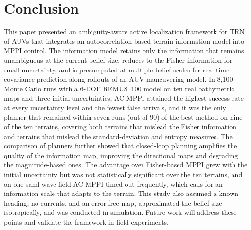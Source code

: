 \documentclass[letterpaper, 10 pt, journal, twoside]{IEEEtran}
\begin{document}
\section{Conclusion}
\label{sec:conclusion}
This paper presented an ambiguity-aware active localization framework for TRN of AUVs that integrates an autocorrelation-based terrain information model into MPPI control. The information model retains only the information that remains unambiguous at the current belief size, reduces to the Fisher information for small uncertainty, and is precomputed at multiple belief scales for real-time covariance prediction along rollouts of an AUV maneuvering model. In 8,100 Monte Carlo runs with a 6-DOF REMUS~100 model on ten real bathymetric maps and three initial uncertainties, AC-MPPI attained the highest success rate at every uncertainty level and the fewest false arrivals, and it was the only planner that remained within seven runs (out of $90$) of the best method on nine of the ten terrains, covering both terrains that mislead the Fisher information and terrains that mislead the standard-deviation and entropy measures. The comparison of planners further showed that closed-loop planning amplifies the quality of the information map, improving the directional maps and degrading the magnitude-based ones. The advantage over Fisher-based MPPI grew with the initial uncertainty but was not statistically significant over the ten terrains, and on one sand-wave field AC-MPPI timed out frequently, which calls for an information scale that adapts to the terrain. This study also assumed a known heading, no currents, and an error-free map, approximated the belief size isotropically, and was conducted in simulation. Future work will address these points and validate the framework in field experiments.

\balance


\end{document}
